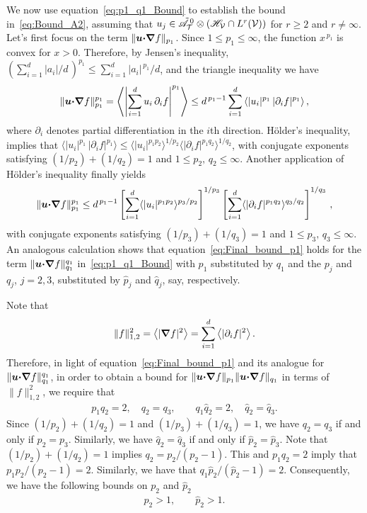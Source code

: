 \documentclass[amsa]{ipart}
\begin{document}
We now use equation~\eqref{eq:p1_q1_Bound} to establish the bound
in~\eqref{eq:Bound_A2}, assuming that
$u_j\in\tilde{\mathscr{A}}^{\,0}_{\mathcal{T}}\otimes(\mathscr{H}_{\mathcal{V}}\cap L^r(\mathcal{V}))$ for $r\geq2$ and
$r\neq\infty$. Let's first focus 
on the term $\|\boldsymbol{u}\mbox{\boldmath${\cdot}$}\mbox{\boldmath${\nabla}$} f\|_{p_1}$.  Since $1\leq p_1\leq\infty$,
the function $x^{\,p_1}$ is convex for $x>0$. Therefore, by Jensen's
inequality, $(\sum_{i=1}^d|a_i|/d\,)^{p_1}\leq\sum_{i=1}^d|a_i|^{\,p_1}/d$, and the
triangle inequality we have
%
\begin{align}
  \|\vecu\bcdot\bnabla f\|^{p_1}_{p_1}
  =\left\langle\left|\sum_{i=1}^du_i\,\partial_if\right|^{p_1}\right\rangle
  \leq d^{\,p_1-1}\sum_{i=1}^d\left\langle|u_i|^{p_1}\,|\partial_if|^{p_1} \right\rangle,
\end{align}
%
where $\partial_i$ denotes partial differentiation in the $i$th
direction. H{\"o}lder's inequality, implies that
$\langle|u_i|^{p_1}\,|\partial_if|^{p_1}\rangle\leq\langle|u_i|^{p_1p_2}\rangle^{1/p_2}\langle|\partial_if|^{p_1q_2}\rangle^{1/q_2}$,
with conjugate exponents satisfying $(1/p_2)+(1/q_2)=1$ and $1\leq
p_2,\,q_2\leq\infty$. 
Another application of H{\"o}lder's inequality finally yields
%
\begin{align}\label{eq:Final_bound_p1}
  \|\vecu\bcdot\bnabla f\|^{p_1}_{p_1}
  \leq d^{\,p_1-1}
   \left[\sum_{i=1}^d\langle|u_i|^{p_1p_2}\rangle^{p_3/p_2}\right]^{1/p_3}
   \left[\sum_{i=1}^d\langle|\partial_if|^{p_1q_2}\rangle^{q_3/q_2}\right]^{1/q_3}\,,
\end{align}
%
with conjugate exponents satisfying $(1/p_3)+(1/q_3)=1$ and $1\leq
p_3,\,q_3\leq\infty$.
An analogous calculation shows that equation~\eqref{eq:Final_bound_p1}
holds for the term $\|\boldsymbol{u}\mbox{\boldmath${\cdot}$}\mbox{\boldmath${\nabla}$} f\|^{q_1}_{q_1}$
in~\eqref{eq:p1_q1_Bound} with $p_1$ 
substituted by $q_1$ and the $p_j$ and $q_j$, $j=2,3$, substituted
by $\hat{p}_j$ and $\hat{q}_j$, say, respectively.




Note that
%
\begin{align}
  \|f\|^2_{1,2}=\left\langle|\bnabla f|^2\right\rangle=\sum_{i=1}^d\left\langle|\partial_if|^2\right\rangle.
\end{align}
%
Therefore, in light of equation~\eqref{eq:Final_bound_p1} and its
analogue for $\|\boldsymbol{u}\mbox{\boldmath${\cdot}$}\mbox{\boldmath${\nabla}$} f\|^{q_1}_{q_1}$, in order to obtain
a bound for $\|\boldsymbol{u}\mbox{\boldmath${\cdot}$}\mbox{\boldmath${\nabla}$} f\|_{p_1}\|\boldsymbol{u}\mbox{\boldmath${\cdot}$}\mbox{\boldmath${\nabla}$} f\|_{q_1}$
in terms of $\|f\|^2_{1,2}$, we require that
%
\begin{align}\label{eq:Restrictions_pi_qi}
  p_1q_2=2, \quad q_2=q_3,
  \qquad
  q_1\hat{q}_2=2, \quad \hat{q}_2=\hat{q}_3.
\end{align}
%
Since $(1/p_2)+(1/q_2)=1$ and $(1/p_3)+(1/q_3)=1$, we have
$q_2=q_3$ if and only if $p_2=p_3$. Similarly, we have
$\hat{q}_2=\hat{q}_3$ if and only if $\hat{p}_2=\hat{p}_3$. Note that
$(1/p_2)+(1/q_2)=1$ implies $q_2=p_2/(p_2-1)$. This and $p_1q_2=2$
imply that $p_1p_2/(p_2-1)=2$. Similarly, we have that
$q_1\hat{p}_2/(\hat{p}_2-1)=2$.
Consequently, we have the following bounds on $p_2$ and $\hat{p}_2$
%
\begin{align}\label{eq:p_2_gtr_1}
  p_2>1, \qquad \hat{p}_2>1.
\end{align}
%
\end{document}
